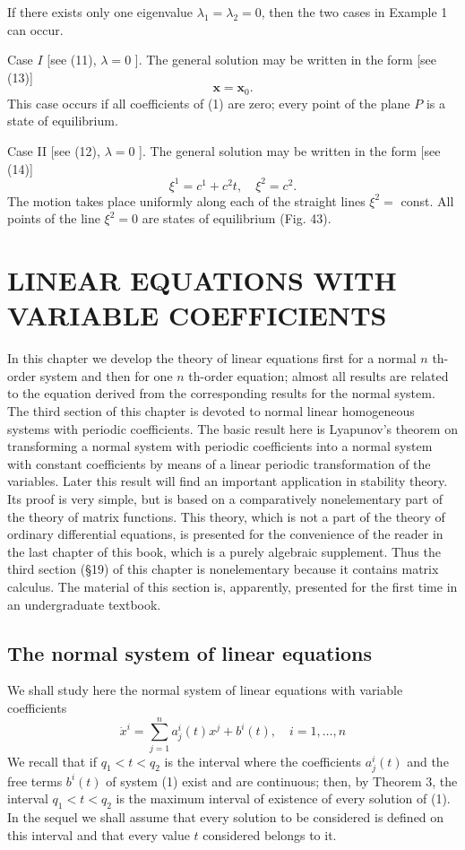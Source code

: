\documentclass[10pt,a5paper]{book}
\theoremstyle{plain}
\theoremstyle{definition}
\theoremstyle{remark}
\begin{document}
If there exists only one eigenvalue $\lambda_{1}=\lambda_{2}=0$, then the two cases in Example 1 can occur.

Case $I$ [see (11), $\lambda=0$ ]. The general solution may be written in the form [see (13)]
\[
\mathbf{x}=\mathbf{x}_{0} .
\]
This case occurs if all coefficients of (1) are zero; every point of the plane $P$ is a state of equilibrium.

Case II [see (12), $\lambda=0$ ]. The general solution may be written in the form [see (14)]
\[
\xi^{1}=c^{1}+c^{2} t, \quad \xi^{2}=c^{2} .
\]
The motion takes place uniformly along each of the straight lines $\xi^{2}=$ const. All points of the line $\xi^{2}=0$ are states of equilibrium (Fig. 43).

\chapter{LINEAR EQUATIONS WITH VARIABLE COEFFICIENTS}
In this chapter we develop the theory of linear equations first for a normal $n$ th-order system and then for one $n$ th-order equation; almost all results are related to the equation derived from the corresponding results for the normal system. The third section of this chapter is devoted to normal linear homogeneous systems with periodic coefficients. The basic result here is Lyapunov's theorem on transforming a normal system with periodic coefficients into a normal system with constant coefficients by means of a linear periodic transformation of the variables. Later this result will find an important application in stability theory. Its proof is very simple, but is based on a comparatively nonelementary part of the theory of matrix functions. This theory, which is not a part of the theory of ordinary differential equations, is presented for the convenience of the reader in the last chapter of this book, which is a purely algebraic supplement. Thus the third section (§19) of this chapter is nonelementary because it contains matrix calculus. The material of this section is, apparently, presented for the first time in an undergraduate textbook.

\section{The normal system of linear equations}
We shall study here the normal system of linear equations with variable coefficients
\begin{equation*}
\dot{x}^{i}=\sum_{j=1}^{n} a_{j}^{i}(t) x^{j}+b^{i}(t), \quad i=1, \ldots, n \tag{1}
\end{equation*}
We recall that if $q_{1}<t<q_{2}$ is the interval where the coefficients $a_{j}^{i}(t)$ and the free terms $b^{i}(t)$ of system (1) exist and are continuous; then, by Theorem 3, the interval $q_{1}<t<q_{2}$ is the maximum interval of existence of every solution of (1). In the sequel we shall assume that every solution to be considered is defined on this interval and that every value $t$ considered belongs to it.
\end{document}
